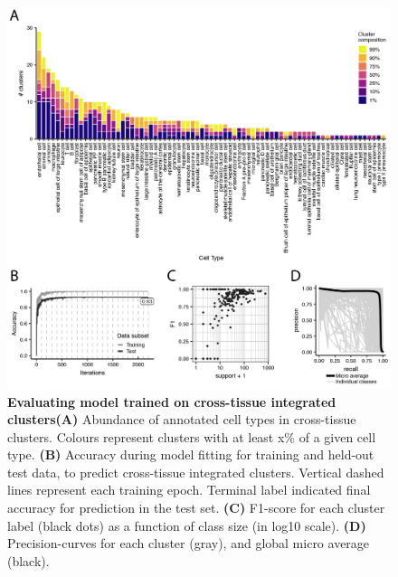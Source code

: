 \begin{figure}[ht!]
    \centering    
    \includegraphics[width=1.0\textwidth]{Chapter3/Figs/chap3_modelcl.png} %
    \caption[Evaluating model trained on cross-tissue integrated clusters]{\textbf{Evaluating model trained on cross-tissue integrated clusters}\newline\textbf{(A)} Abundance of annotated cell types in cross-tissue clusters. Colours represent clusters with at least x\% of a given cell type. \textbf{(B)} Accuracy during model fitting for training and held-out test data, to predict cross-tissue integrated clusters. Vertical dashed lines represent each training epoch. Terminal label indicated final accuracy for prediction in the test set. \textbf{(C)} F1-score for each cluster label (black dots) as a function of class size (in log10 scale). \textbf{(D)} Precision-curves for each cluster (gray), and global micro average (black).}
    \label{fig:chap3_modelcl}
\end{figure}

